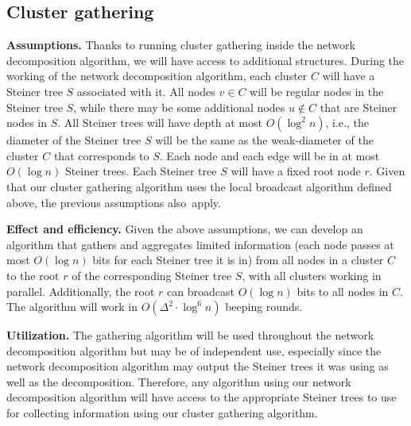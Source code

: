 \subsection{Cluster gathering}
\label{sec:gathering}


\noindent \textbf{Assumptions.} %
Thanks to running cluster gathering inside the network decomposition algorithm, we will have access to additional structures. During the working of the network decomposition algorithm, each cluster $C$ will have a Steiner tree $S$ associated with it. All nodes $v \in C$ will be regular nodes in the Steiner tree $S$, while there may be some additional nodes $u \notin C$ that are Steiner nodes in $S$. All Steiner trees will have depth at most $O(\log^2 n)$, i.e., the diameter of the Steiner tree $S$ will be the same as the weak-diameter of the cluster $C$ that corresponds to $S$. Each node and each edge will be in at most $O(\log n)$ Steiner trees. Each Steiner tree $S$ will have a fixed root node $r$.
Given that our cluster gathering algorithm uses the local broadcast algorithm defined above, the previous assumptions also~apply.


\noindent \textbf{Effect and efficiency.} Given the above assumptions, we can develop an algorithm that gathers and aggregates limited information (each node passes at most $O(\log n)$ bits for each Steiner tree it is in) from all nodes in a cluster $C$ to the root $r$ of the corresponding Steiner tree $S$, with all clusters working in parallel. Additionally, the root $r$ can broadcast $O(\log n)$ bits to all nodes in $C$. The algorithm will work in $O(\Delta^2 \cdot \log^6 n)$ beeping rounds.

\noindent \textbf{Utilization.} The gathering algorithm will be used throughout the network decomposition algorithm but may be of independent use, especially since the network decomposition algorithm may output the Steiner trees it was using as well as the decomposition. Therefore, any algorithm using our network decomposition algorithm will have access to the appropriate Steiner trees to use for %
collecting information using our cluster gathering algorithm.

\clustergatherthm*
{}

